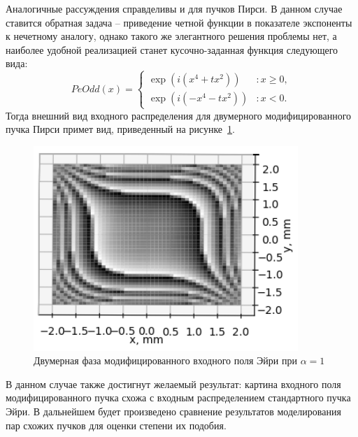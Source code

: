 {{    Аналогичные рассуждения справделивы и для пучков Пирси.
    В данном случае ставится обратная задача -- приведение четной функции в показателе экспоненты к нечетному аналогу,
    однако такого же элегантного решения проблемы нет, а наиболее удобной реализацией станет кусочно-заданная функция следующего вида:
    \[PeOdd(x) = \left\{
    \begin{array}{lr}
        \exp(i(x^4 + tx^2)) & : x \ge 0,\\
        \exp(i(-x^4 - tx^2)) & : x < 0.
    \end{array}
    \right.
    \]
    Тогда внешний вид входного распределения для двумерного модифицированного пучка Пирси примет вид, приведенный на рисунке~\ref{peodd_phase_2d}.
    \begin{figure}[H]
        \begin{center}
            \includegraphics[width=10cm]{plots/peoddphase_new}
            \caption{Двумерная фаза модифицированного входного поля Эйри при $\alpha  = 1$}
            \label{peodd_phase_2d}
        \end{center}
    \end{figure}
    В данном случае также достигнут желаемый результат: картина входного поля модифицированного пучка схожа с входным распределением стандартного пучка Эйри.
    В дальнейшем будет произведено сравнение результатов моделирования пар схожих пучков для оценки степени их подобия.
    }\label{subsec:изменение-характеристик-пространственных-спектров}
    }\label{sec:построение-входных-распределений-пучков-эйри,-пирси-и-их-модификаций-в-виде-пространственных-спектров}
    \newpage


